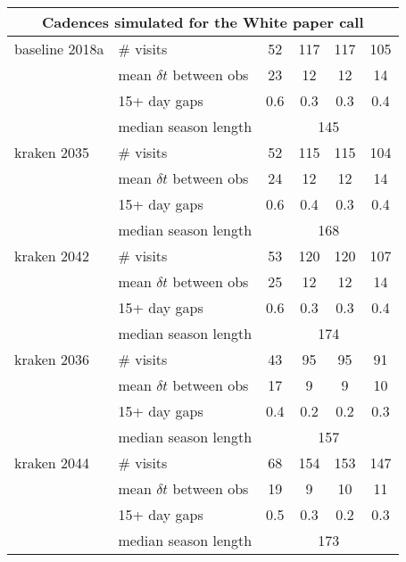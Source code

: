 \begin{appendices}
\begin{longtable}{l|l|cccc}
  \hline
  \hline
  \multicolumn{6}{c}{Cadences simulated for the White paper call}\\
  \hline      
  baseline 2018a & \# visits                   &   52  & 117  & 117  & 105   \\
                 & mean $\delta t$ between obs &   23  &  12  &  12  &  14   \\
                 & 15+ day gaps                &   0.6 & 0.3  & 0.3  &  0.4  \\
                 & median season length               & \multicolumn{4}{c}{145} \\
  \hline
  kraken 2035    & \# visits                   &   52 &  115 &  115 &  104 \\
                 & mean $\delta t$ between obs &   24 &   12 &   12 &   14 \\
                 & 15+ day gaps                &  0.6 &  0.4 &  0.3 &  0.4 \\
                 & median season length               & \multicolumn{4}{c}{168}   \\
  \hline

  kraken 2042    & \# visits                   &   53 &  120 &  120 &  107 \\
                 & mean $\delta t$ between obs &  25  &   12 &   12 &   14 \\
                 & 15+ day gaps                &  0.6 &  0.3 &  0.3 &  0.4 \\
                 & median season length               & \multicolumn{4}{c}{174}   \\
  \hline

  kraken 2036    & \# visits                   &  43  &   95 &   95 &   91 \\
                 & mean $\delta t$ between obs &  17  &    9 &    9 &   10 \\
                 & 15+ day gaps                &  0.4 &   0.2&  0.2 &  0.3 \\
                 & median season length               & \multicolumn{4}{c}{157}   \\
  \hline

  kraken 2044    & \# visits                   &  68  &  154 &  153 & 147  \\
                 & mean $\delta t$ between obs &  19  &    9 &   10 &  11  \\
                 & 15+ day gaps                & 0.5  &  0.3 &  0.2 & 0.3  \\
                 & median season length               & \multicolumn{4}{c}{173}   \\
  \hline


\end{longtable}
\end{appendices}
